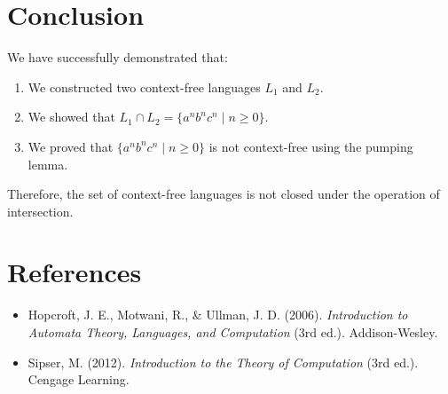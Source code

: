 \documentclass[12pt]{article}
\begin{document}
\section{Conclusion}

We have successfully demonstrated that:

\begin{enumerate}
\item We constructed two context-free languages $L_1$ and $L_2$.
\item We showed that $L_1 \cap L_2 = \{a^n b^n c^n \mid n \geq 0\}$.
\item We proved that $\{a^n b^n c^n \mid n \geq 0\}$ is not context-free using the pumping lemma.
\end{enumerate}

Therefore, the set of context-free languages is not closed under the operation of intersection.

\section{References}

\begin{itemize}
\item Hopcroft, J. E., Motwani, R., \& Ullman, J. D. (2006). \textit{Introduction to Automata Theory, Languages, and Computation} (3rd ed.). Addison-Wesley.
\item Sipser, M. (2012). \textit{Introduction to the Theory of Computation} (3rd ed.). Cengage Learning.
\end{itemize}
\end{document}
